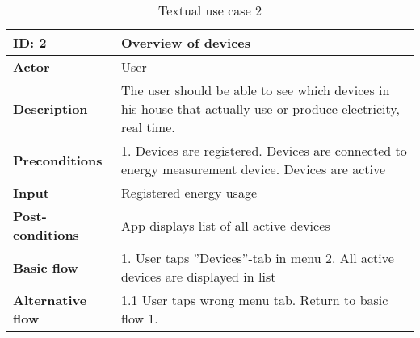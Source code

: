 \begin{table}[H]
\begin{tabular}{|l|p{11.7cm}|}
\hline
\textbf{ID:} 2&\textbf{Overview of devices}\\\hline
\textbf{Actor} &User\\\hline
\textbf{Description}&
The user should be able to see which devices in his house that actually use or produce electricity, real time.\\\hline
\textbf{Preconditions}&
1. Devices are registered\newline
2. Devices are connected to energy measurement device\newline
3. Devices are active\\\hline
\textbf{Input}&
Registered energy usage\\\hline
\textbf{Post-conditions}& App displays list of all active devices\\\hline
\textbf{Basic flow}&
1. User taps ''Devices''-tab in menu
2. All active devices are displayed in list\\\hline
\textbf{Alternative flow}&
1.1 User taps wrong menu tab. Return to basic flow 1.\\\hline
\end{tabular}
\caption{Textual use case 2}
\end{table}




